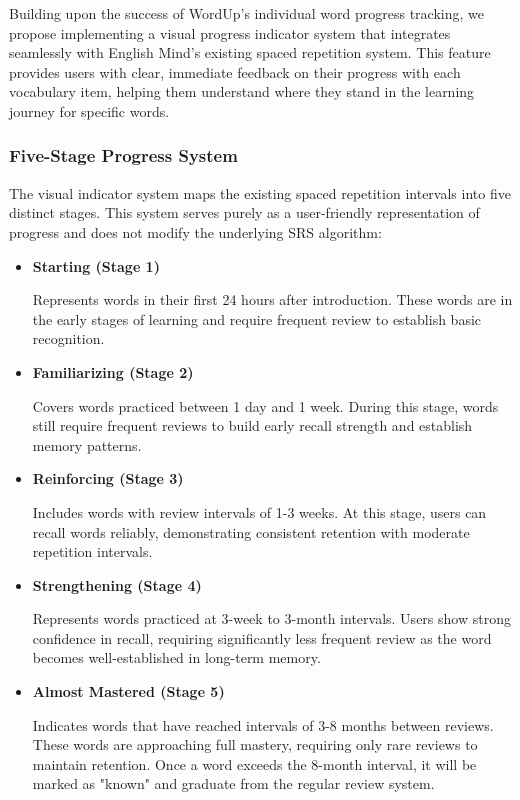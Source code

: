 Building upon the success of WordUp's individual word progress tracking, we propose implementing a visual progress indicator system that integrates seamlessly with English Mind's existing spaced repetition system. This feature provides users with clear, immediate feedback on their progress with each vocabulary item, helping them understand where they stand in the learning journey for specific words.

\subsubsection{Five-Stage Progress System}

The visual indicator system maps the existing spaced repetition intervals into five distinct stages. This system serves purely as a user-friendly representation of progress and does not modify the underlying SRS algorithm:


\begin{itemize}
    \item \textbf{Starting (Stage 1)}
    
    Represents words in their first 24 hours after introduction. These words are in the early stages of learning and require frequent review to establish basic recognition.
    
    \item \textbf{Familiarizing (Stage 2)}
    
    Covers words practiced between 1 day and 1 week. During this stage, words still require frequent reviews to build early recall strength and establish memory patterns.
    
    \item \textbf{Reinforcing (Stage 3)}
    
    Includes words with review intervals of 1-3 weeks. At this stage, users can recall words reliably, demonstrating consistent retention with moderate repetition intervals.
    
    \item \textbf{Strengthening (Stage 4)}
    
    Represents words practiced at 3-week to 3-month intervals. Users show strong confidence in recall, requiring significantly less frequent review as the word becomes well-established in long-term memory.
    
    \item \textbf{Almost Mastered (Stage 5)}
    
    Indicates words that have reached intervals of 3-8 months between reviews. These words are approaching full mastery, requiring only rare reviews to maintain retention. Once a word exceeds the 8-month interval, it will be marked as "known" and graduate from the regular review system.
\end{itemize}

